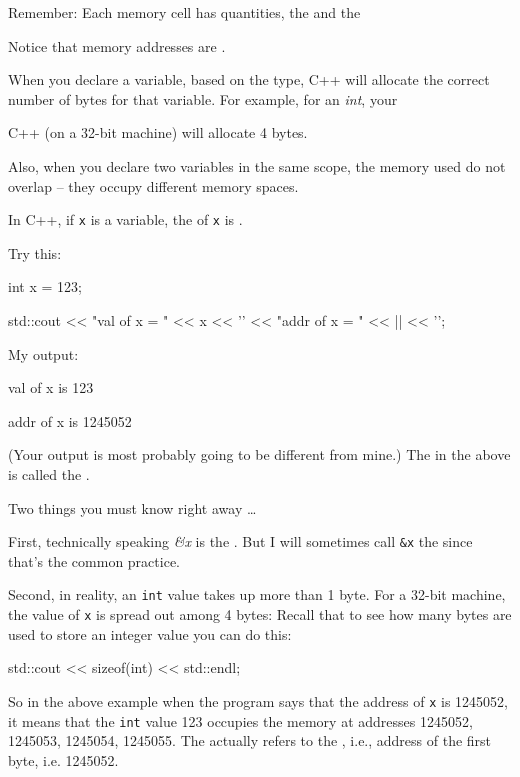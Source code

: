 Remember: Each memory cell has  quantities, the  and the 

Notice that memory addresses are .

When you declare a variable, based on the type, C++ will allocate the correct number of bytes for that variable. For example, for an \emph{int}, your

C++ (on a 32-bit machine) will allocate 4 bytes.

Also, when you declare two variables in the same scope, the memory used do not overlap -- they occupy different memory spaces.

\newpage{}

In C++, if \verb!x! is a variable, the  of \verb!x! is .

Try this:

\begin{consolethree}[escapeinside=||]
int x = 123;

std::cout << "val of x = " << x << '\n'
          << "addr of x = " << || << '\n';
\end{consolethree}

My output:

\begin{consolethree}[escapeinside=||]
val of x is 123

addr of x is 1245052
\end{consolethree}
(Your output is most probably going to be different from mine.) The \EMPHASIZE{\&} in the above is called the .

Two things you must know right away \ldots{}

First, technically speaking \emph{\&x} is the \emph{}\texttt{}. But I will sometimes call \texttt{\&x} the \texttt{} since that's the common practice.

Second, in reality, an \texttt{int} value takes up more than 1 byte. For a 32-bit machine, the value of \texttt{x} is spread out among 4 bytes: Recall that to see how many bytes are used to store an integer value you can do this:

\begin{consolethree}[escapeinside=||]
std::cout << sizeof(int) << std::endl;
\end{consolethree}
So in the above example when the program says that the address of \texttt{x} is 1245052, it means that the \texttt{int} value 123 occupies the memory at addresses 1245052, 1245053, 1245054, 1245055. The \texttt{} actually refers to the , i.e., address of the first byte, i.e. 1245052.

